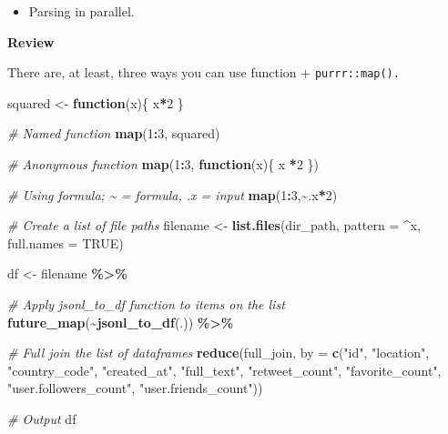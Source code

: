 \documentclass[
]{book}
\newenvironment{Shaded}{\begin{snugshade}}{\end{snugshade}}
\newcommand{\AttributeTok}[1]{\textcolor[rgb]{0.13,0.29,0.53}{#1}}
\newcommand{\CommentTok}[1]{\textcolor[rgb]{0.56,0.35,0.01}{\textit{#1}}}
\newcommand{\ConstantTok}[1]{\textcolor[rgb]{0.56,0.35,0.01}{#1}}
\newcommand{\ControlFlowTok}[1]{\textcolor[rgb]{0.13,0.29,0.53}{\textbf{#1}}}
\newcommand{\DecValTok}[1]{\textcolor[rgb]{0.00,0.00,0.81}{#1}}
\newcommand{\FunctionTok}[1]{\textcolor[rgb]{0.13,0.29,0.53}{\textbf{#1}}}
\newcommand{\NormalTok}[1]{#1}
\newcommand{\OtherTok}[1]{\textcolor[rgb]{0.56,0.35,0.01}{#1}}
\newcommand{\SpecialCharTok}[1]{\textcolor[rgb]{0.81,0.36,0.00}{\textbf{#1}}}
\newcommand{\StringTok}[1]{\textcolor[rgb]{0.31,0.60,0.02}{#1}}
\providecommand{\tightlist}{%
  \setlength{\itemsep}{0pt}\setlength{\parskip}{0pt}}
\begin{document}
\begin{itemize}
\tightlist
\item
  Parsing in parallel.
\end{itemize}

\textbf{Review}

There are, at least, three ways you can use function + \texttt{purrr::map().}

\begin{Shaded}
\begin{Highlighting}[]
\NormalTok{squared }\OtherTok{\textless{}{-}} \ControlFlowTok{function}\NormalTok{(x)\{}
\NormalTok{  x}\SpecialCharTok{*}\DecValTok{2} 
\NormalTok{\}}

\CommentTok{\# Named function }
\FunctionTok{map}\NormalTok{(}\DecValTok{1}\SpecialCharTok{:}\DecValTok{3}\NormalTok{, squared)}

\CommentTok{\# Anonymous function }
\FunctionTok{map}\NormalTok{(}\DecValTok{1}\SpecialCharTok{:}\DecValTok{3}\NormalTok{, }\ControlFlowTok{function}\NormalTok{(x)\{ x }\SpecialCharTok{*}\DecValTok{2}\NormalTok{ \})}

\CommentTok{\# Using formula; \textasciitilde{} = formula, .x = input }
\FunctionTok{map}\NormalTok{(}\DecValTok{1}\SpecialCharTok{:}\DecValTok{3}\NormalTok{,}\SpecialCharTok{\textasciitilde{}}\NormalTok{.x}\SpecialCharTok{*}\DecValTok{2}\NormalTok{)}
\end{Highlighting}
\end{Shaded}

\begin{Shaded}
\begin{Highlighting}[]
\CommentTok{\# Create a list of file paths }
\NormalTok{filename }\OtherTok{\textless{}{-}} \FunctionTok{list.files}\NormalTok{(dir\_path,}
          \AttributeTok{pattern =} \StringTok{\textquotesingle{}\^{}x\textquotesingle{}}\NormalTok{,}
          \AttributeTok{full.names =} \ConstantTok{TRUE}\NormalTok{)}

\NormalTok{df }\OtherTok{\textless{}{-}}\NormalTok{ filename }\SpecialCharTok{\%\textgreater{}\%}

\CommentTok{\# Apply jsonl\_to\_df function to items on the list}
\FunctionTok{future\_map}\NormalTok{(}\SpecialCharTok{\textasciitilde{}}\FunctionTok{jsonl\_to\_df}\NormalTok{(.)) }\SpecialCharTok{\%\textgreater{}\%}

\CommentTok{\# Full join the list of dataframes}
\FunctionTok{reduce}\NormalTok{(full\_join,}
       \AttributeTok{by =} \FunctionTok{c}\NormalTok{(}\StringTok{"id"}\NormalTok{,}
              \StringTok{"location"}\NormalTok{,}
              \StringTok{"country\_code"}\NormalTok{,}
              \StringTok{"created\_at"}\NormalTok{,}
              \StringTok{"full\_text"}\NormalTok{,}
              \StringTok{"retweet\_count"}\NormalTok{,}
              \StringTok{"favorite\_count"}\NormalTok{,}
              \StringTok{"user.followers\_count"}\NormalTok{,}
              \StringTok{"user.friends\_count"}\NormalTok{))}

\CommentTok{\# Output}
\NormalTok{df}
\end{Highlighting}
\end{Shaded}
\end{document}
